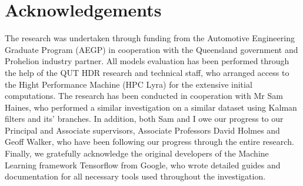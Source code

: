 \section{Acknowledgements}\label{sec:acknowledgements}
The research was undertaken through funding from the Automotive Engineering Graduate Program (AEGP) in cooperation with the Queensland government and Prohelion industry partner.
All models evaluation has been performed through the help of the QUT HDR research and technical staff, who arranged access to the Hight Performance Machine (HPC Lyra) for the extensive initial computations.
The research has been conducted in cooperation with Mr Sam Haines, who performed a similar investigation on a similar dataset using Kalman filters and its' branches.
In addition, both Sam and I owe our progress to our Principal and Associate supervisors, Associate Professors David Holmes and Geoff Walker, who have been following our progress through the entire research.
Finally, we gratefully acknowledge the original developers of the Machine Learning framework Tensorflow from Google, who wrote detailed guides and documentation for all necessary tools used throughout the investigation.
